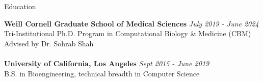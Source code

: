 \documentclass{resume} %
\begin{document}

\begin{rSection}{Education}

{\bf Weill Cornell Graduate School of Medical Sciences} \hfill {\em July 2019 - June 2024} 
\\ Tri-Institutional Ph.D. Program in Computational Biology \& Medicine (CBM)
\\ Advised by Dr. Sohrab Shah
\\
\\{\bf University of California, Los Angeles} \hfill {\em Sept 2015 - June 2019} 
\\ B.S. in Bioengineering, technical breadth in Computer Science

\end{rSection}

\end{document}

